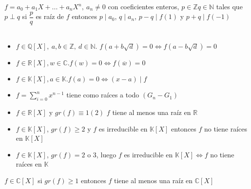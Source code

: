 \documentclass[a4paper,10pt]{article}
\begin{document}
\teorema $f = a_0 + a_1 X + ... + a_n X^{n}, \ a_n \neq 0 $ con coeficientes enteros, $p \in \mathbb{Z} q \in \mathbb{N}$ tales que $p \perp q$ si $\dfrac{p}{q}$ es raíz de $f$ entonces $p \mid a_0$, $q \mid a_n$, $p-q \mid f(1)$ y $p+q \mid f(-1)$ \\ \\
\clearpage

\propiedades
\begin{itemize}
	\item $f \in \mathbb{Q}[X], \ a,b \in \mathbb{Z}, \ d \in \mathbb{N}$. $f(a+b\sqrt{d})=0 \Leftrightarrow f(a-b\sqrt{d}) = 0$
	\item $f \in \mathbb{R}[X], w \in \mathbb{C}. f(w) = 0 \Leftrightarrow f(\overline{w}) = 0$
	\item $f \in \mathbb{K}[X], a \in \mathbb{K}. f(a) = 0 \Leftrightarrow (x-a) \mid f$
	\item $\displaystyle f = \sum_{i=0}^{n} {x^{n-1}}$ tiene como raíces a todo $(G_{n}-G_{1})$
	\item $f \in \mathbb{R}[X]$ y $gr(f) \equiv 1 (2)$ $f$ tiene al menos una raíz en $\mathbb{R}$
	\item $f \in \mathbb{K}[X]$, $gr(f) \geq 2$ y $f$ es irreducible en $\mathbb{K}[X]$ entonces $f$ no tiene raíces en $\mathbb{K}[X]$
	\item $f \in \mathbb{K}[X]$, $gr(f) = 2 \mbox{ o } 3$, luego $f$ es irreducible en $\mathbb{K}[X] \Leftrightarrow f$ no tiene raíces en $\mathbb{K}$
\end{itemize}

 $f \in \mathbb{C}[X]$ si $gr(f) \geq 1$ entonces $f$ tiene al menos una raíz en $\mathbb{C}[X]$ \\ \\

\clearpage
\end{document}
